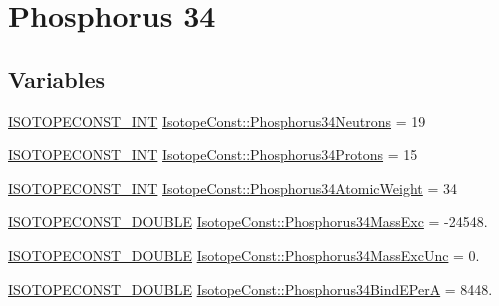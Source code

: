 \hypertarget{group___isotope_const-_phosphorus-_p34}{}\section{Phosphorus 34}
\label{group___isotope_const-_phosphorus-_p34}
\subsection*{Variables}
\begin{DoxyCompactItemize}
\item 
\mbox{\hyperlink{group___isotope_const-_macros_ga5f18360b3e99483a35c32d789e62621c}{I\+S\+O\+T\+O\+P\+E\+C\+O\+N\+S\+T\+\_\+\+I\+NT}} \mbox{\hyperlink{group___isotope_const-_phosphorus-_p34_ga854fcf9d0d667a837bd65de90b27f280}{Isotope\+Const\+::\+Phosphorus34\+Neutrons}} = 19
\item 
\mbox{\hyperlink{group___isotope_const-_macros_ga5f18360b3e99483a35c32d789e62621c}{I\+S\+O\+T\+O\+P\+E\+C\+O\+N\+S\+T\+\_\+\+I\+NT}} \mbox{\hyperlink{group___isotope_const-_phosphorus-_p34_gafea1149d1a1045a42b16065cc555afb2}{Isotope\+Const\+::\+Phosphorus34\+Protons}} = 15
\item 
\mbox{\hyperlink{group___isotope_const-_macros_ga5f18360b3e99483a35c32d789e62621c}{I\+S\+O\+T\+O\+P\+E\+C\+O\+N\+S\+T\+\_\+\+I\+NT}} \mbox{\hyperlink{group___isotope_const-_phosphorus-_p34_ga9aa5b4d9eea6b4595d19327b65c9c613}{Isotope\+Const\+::\+Phosphorus34\+Atomic\+Weight}} = 34
\item 
\mbox{\hyperlink{group___isotope_const-_macros_ga8f45a7272ce02c0b4c65c44636ed719a}{I\+S\+O\+T\+O\+P\+E\+C\+O\+N\+S\+T\+\_\+\+D\+O\+U\+B\+LE}} \mbox{\hyperlink{group___isotope_const-_phosphorus-_p34_ga9f5a86a521b1780b60989f26e4db5e7d}{Isotope\+Const\+::\+Phosphorus34\+Mass\+Exc}} = -\/24548.
\item 
\mbox{\hyperlink{group___isotope_const-_macros_ga8f45a7272ce02c0b4c65c44636ed719a}{I\+S\+O\+T\+O\+P\+E\+C\+O\+N\+S\+T\+\_\+\+D\+O\+U\+B\+LE}} \mbox{\hyperlink{group___isotope_const-_phosphorus-_p34_gadc1826830062ed831d08d06942ffee8e}{Isotope\+Const\+::\+Phosphorus34\+Mass\+Exc\+Unc}} = 0.
\item 
\mbox{\hyperlink{group___isotope_const-_macros_ga8f45a7272ce02c0b4c65c44636ed719a}{I\+S\+O\+T\+O\+P\+E\+C\+O\+N\+S\+T\+\_\+\+D\+O\+U\+B\+LE}} \mbox{\hyperlink{group___isotope_const-_phosphorus-_p34_gacf46a441e0bc12c35db611f9c671d61d}{Isotope\+Const\+::\+Phosphorus34\+Bind\+E\+PerA}} = 8448.
\item 

\end{DoxyCompactItemize}

